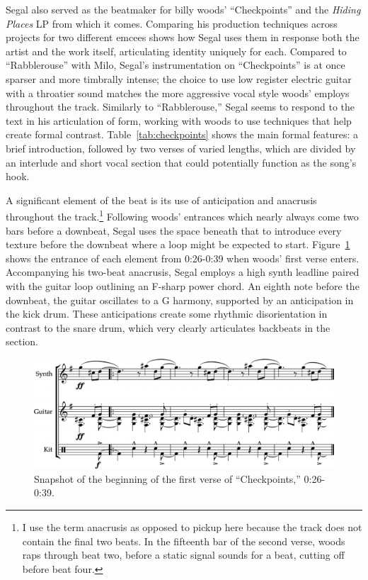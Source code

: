 Segal also served as the beatmaker for billy woods' ``Checkpoints'' and the \textit{Hiding Places} LP from which it comes. Comparing his production techniques across projects for two different emcees shows how Segal uses them in response both the artist and the work itself, articulating identity uniquely for each. Compared to ``Rabblerouse'' with Milo, Segal's instrumentation on ``Checkpoints'' is at once sparser and more timbrally intense; the choice to use low register electric guitar with a throatier sound matches the more aggressive vocal style woods' employs throughout the track. Similarly to ``Rabblerouse,'' Segal seems to respond to the text in his articulation of form, working with woods to use techniques that help create formal contrast. Table~\ref{tab:checkpoints} shows the main formal features: a brief introduction, followed by two verses of varied lengths, which are divided by an interlude and short vocal section that could potentially function as the song's hook.

A significant element of the beat is its use of anticipation and anacrusis throughout the track.\footnote{I use the term anacrusis as opposed to pickup here because the track does not contain the final two beats. In the fifteenth bar of the second verse, woods raps through beat two, before a static signal sounds for a beat, cutting off before beat four.} Following woods' entrances which nearly always come two bars before a downbeat, Segal uses the space beneath that to introduce every texture before the downbeat where a loop might be expected to start. Figure~\ref{fig:checkpointsintro} shows the entrance of each element from 0:26-0:39 when woods' first verse enters. Accompanying his two-beat anacrusis, Segal employs a high synth leadline paired with the guitar loop outlining an F-sharp power chord. An eighth note before the downbeat, the guitar oscillates to a G harmony, supported by an anticipation in the kick drum. These anticipations create some rhythmic disorientation in contrast to the snare drum, which very clearly articulates backbeats in the section.

    \begin{figure}[ht]
        \centering
        \includegraphics[width=\textwidth]{images/figures/chp 02/026039checkpointsintro.pdf}
        \caption{Snapshot of the beginning of the first verse of ``Checkpoints,'' 0:26-0:39.}
        \label{fig:checkpointsintro}
    \end{figure}


